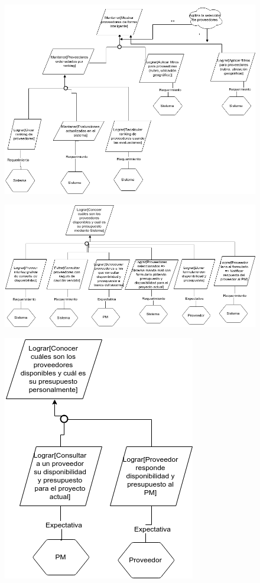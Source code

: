 \begin{figure}[H]
    \centering
    \includegraphics[width=\textwidth]{imagenes/objetivos-seleccion-mejor-proveedor-2.png}
\end{figure}

\begin{figure}[H]
    \centering
    \includegraphics[width=\textwidth]{imagenes/objetivos-seleccion-mejor-proveedor-3.png}
\end{figure}

\begin{figure}[H]
    \centering
    \includegraphics[width=.5\textwidth]{imagenes/objetivos-seleccion-mejor-proveedor-4.png}
\end{figure}

